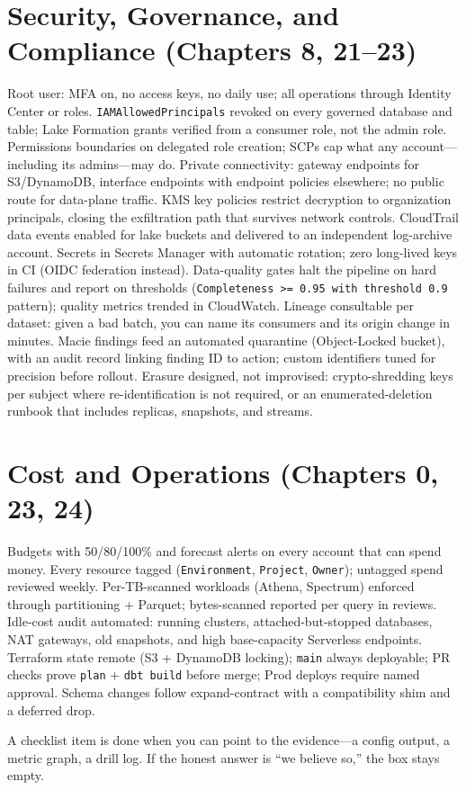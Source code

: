 \section{Security, Governance, and Compliance (Chapters 8, 21--23)}
%
\begin{itemize}
\chk Root user: MFA on, no access keys, no daily use; all operations through Identity Center or
roles.
\chk \texttt{IAMAllowedPrincipals} revoked on every governed database and table; Lake Formation
grants verified from a consumer role, not the admin role.
\chk Permissions boundaries on delegated role creation; SCPs cap what any account---including its
admins---may do.
\chk Private connectivity: gateway endpoints for S3/DynamoDB, interface endpoints with endpoint
policies elsewhere; no public route for data-plane traffic.
\chk KMS key policies restrict decryption to organization principals, closing the exfiltration
path that survives network controls.
\chk CloudTrail data events enabled for lake buckets and delivered to an independent log-archive
account.
\chk Secrets in Secrets Manager with automatic rotation; zero long-lived keys in CI (OIDC
federation instead).
\chk Data-quality gates halt the pipeline on hard failures and report on thresholds
(\texttt{Completeness >= 0.95 with threshold 0.9} pattern); quality metrics trended in CloudWatch.
\chk Lineage consultable per dataset: given a bad batch, you can name its consumers and its
origin change in minutes.
\chk Macie findings feed an automated quarantine (Object-Locked bucket), with an audit record
linking finding ID to action; custom identifiers tuned for precision before rollout.
\chk Erasure designed, not improvised: crypto-shredding keys per subject where re-identification
is not required, or an enumerated-deletion runbook that includes replicas, snapshots, and streams.
\end{itemize}

\section{Cost and Operations (Chapters 0, 23, 24)}
%
\begin{itemize}
\chk Budgets with 50/80/100\% and forecast alerts on every account that can spend money.
\chk Every resource tagged (\texttt{Environment}, \texttt{Project}, \texttt{Owner}); untagged
spend reviewed weekly.
\chk Per-TB-scanned workloads (Athena, Spectrum) enforced through partitioning + Parquet;
bytes-scanned reported per query in reviews.
\chk Idle-cost audit automated: running clusters, attached-but-stopped databases, NAT gateways,
old snapshots, and high base-capacity Serverless endpoints.
\chk Terraform state remote (S3 + DynamoDB locking); \texttt{main} always deployable; PR checks
prove \texttt{plan} + \texttt{dbt build} before merge; Prod deploys require named approval.
\chk Schema changes follow expand-contract with a compatibility shim and a deferred drop.
\end{itemize}

\begin{tipbox}
A checklist item is done when you can point to the evidence---a config output, a metric graph, a
drill log. If the honest answer is ``we believe so,'' the box stays empty.
\end{tipbox}
